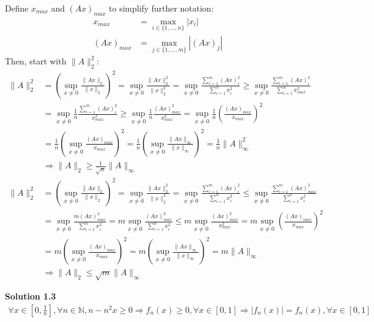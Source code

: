 \documentclass[a4paper,10.5pt]{article}
\newcommand{\N}{\mathbb{N}}
\newcommand{\supx}{\sup_{x\neq0}}
\newcommand{\abs}[1]{\left|#1\right|}
\begin{document}
Define $x_{max}$ and $\left(Ax\right)_{max}$ to simplify further notation:
\begin{align*}
	x_{max} &= \max_{i\in\{1,\dots,n\}} \abs{x_i} \\
	\left(Ax\right)_{max} &= \max_{j\in\{1,\dots,m\}}\abs{\left(Ax\right)_j}
\end{align*}
Then, start with $\|A\|_2^2$:
\begin{align*}
\|A\|_2^2&=\left(\supx\frac{\|Ax\|_2}{\|x\|_2}\right)^2=\supx\frac{\|Ax\|_2^2}{\|x\|_2^2} = \supx \frac{\sum_{i=1}^{m} \left(Ax\right)_i^2}{\sum_{i=1}^{n} x_i^2} \geq \supx \frac{\sum_{i=1}^{m} \left(Ax\right)_i^2}{\sum_{i=1}^{n} x_{max}^2} \\
&=\supx \frac{1}{n}\frac{\sum_{i=1}^{m} \left(Ax\right)_i^2}{x_{max}^2} \geq \supx \frac{1}{n}\frac{\left(Ax\right)_{max}^2}{x_{max}^2} = \supx \frac{1}{n} \left(\frac{\left(Ax\right)_{max}}{x_{max}}\right)^2 \\
&= \frac{1}{n}  \left(\supx\frac{\left(Ax\right)_{max}}{x_{max}}\right)^2 =\frac{1}{n} \left(\supx \frac{\|Ax\|_\infty}{\|x\|_\infty}\right)^2= \frac{1}{n}\|A\|_\infty^2 \\
&\Rightarrow \|A\|_2 \geq \frac{1}{\sqrt{n}}\|A\|_\infty \\
\|A\|_2^2&=\left(\supx\frac{\|Ax\|_2}{\|x\|_2}\right)^2=\supx\frac{\|Ax\|_2^2}{\|x\|_2^2} = \supx \frac{\sum_{i=1}^{m} \left(Ax\right)_{i}^2}{\sum_{i=1}^{n} x_i^2} \leq \supx \frac{\sum_{i=1}^{m} \left(Ax\right)_{max}^2}{\sum_{i=1}^{n} x_{i}^2} \\&= \supx \frac{m \left(Ax\right)_{max}^2}{\sum_{i=1}^{n} x_{i}^2} = m\supx \frac{\left(Ax\right)_{max}^2}{\sum_{i=1}^{n} x_{i}^2} \leq m\supx \frac{\left(Ax\right)_{max}^2}{x_{max}^2} = m\supx \left(\frac{\left(Ax\right)_{max}}{x_{max}}\right)^2 \\
&=m\left(\supx \frac{\left(Ax\right)_{max}}{x_{max}}\right)^2 = m\left(\supx \frac{\|Ax\|_\infty}{\|x\|_\infty}\right)^2 = m\|A\|_\infty \\
&\Rightarrow \|A\|_2 \leq \sqrt{m}\|A\|_\infty
\end{align*}

\clearpage

\noindent \textbf {Solution 1.3} \\
\begin{align*}
\forall x \in \left[0,\frac{1}{n}\right], \forall n \in \N, n - n^2 x \geq 0 \Rightarrow f_n (x) \geq 0, \forall x \in [0,1] \Rightarrow \lvert f_n(x) \rvert = f_n(x), \forall x \in [0,1] \\
\end{align*}
\end{document}
